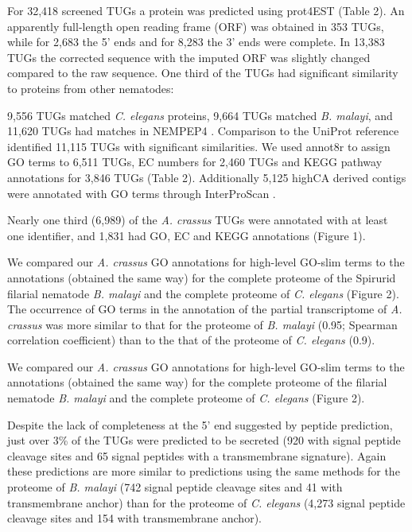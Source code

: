 \documentclass[10pt]{bmc_article}
\newenvironment{bmcformat}{\begin{raggedright}\baselineskip20pt\sloppy\setboolean{publ}{false}}{\end{raggedright}\baselineskip20pt\sloppy}
\begin{document}
\begin{bmcformat}
For
32,418
screened TUGs a protein was predicted using prot4EST
\cite{wasmuth_prot4est:_2004} (Table 2). An apparently full-length
open reading frame (ORF) was obtained in
353 TUGs,
while for 2,683
the 5' ends and for
8,283 the 3' ends
were complete. In 13,383 TUGs the corrected
sequence with the imputed ORF was slightly changed compared to the raw
sequence. One third of the TUGs had significant similarity to proteins
from other nematodes:

9,556
TUGs matched \textit{C. elegans} proteins,
9,664
TUGs matched \textit{B. malayi}, and
11,620
TUGs had matches in NEMPEP4 \cite{parkinson_nembase:resource_2004,
  pmid21550347}. Comparison to the UniProt reference identified
11,115
TUGs with significant similarities. We used annot8r
\cite{schmid_annot8r:_2008} to assign GO terms to 6,511
TUGs, EC numbers for 2,460 TUGs and KEGG pathway annotations
for 3,846 TUGs (Table 2). Additionally 5,125
highCA derived contigs were annotated with GO terms through
InterProScan \cite{pmid11590104}. 

Nearly one third (6,989) of the
\textit{A. crassus} TUGs were annotated with at least one identifier,
and 1,831 had GO, EC and KEGG annotations (Figure
1).

We compared our \textit{A. crassus} GO annotations for high-level
GO-slim terms to the annotations (obtained the same way) for the
complete proteome of the Spirurid filarial nematode \textit{B. malayi}
and the complete proteome of \textit{C. elegans} (Figure 2). The
occurrence of GO terms in the annotation of the partial transcriptome
of \textit{A. crassus} was more similar to that for the proteome of
\textit{B. malayi} (0.95; Spearman correlation coefficient) than to
the that of the proteome of \textit{C. elegans} (0.9).

We compared our \textit{A. crassus} GO annotations for high-level
GO-slim terms to the annotations (obtained the same way) for the
complete proteome of the filarial nematode \textit{B. malayi} and the
complete proteome of \textit{C. elegans} (Figure 2).

Despite the lack of completeness at the 5' end suggested by peptide
prediction, just over 3\% of the TUGs were predicted to be secreted
(920 with signal peptide cleavage sites and
65 signal peptides with a transmembrane
signature). Again these predictions are more similar to predictions
using the same methods for the proteome of \textit{B. malayi} (742
signal peptide cleavage sites and 41 with transmembrane anchor) than
for the proteome of \textit{C. elegans} (4,273 signal peptide cleavage
sites and 154 with transmembrane anchor).


\end{bmcformat}
\end{document}
